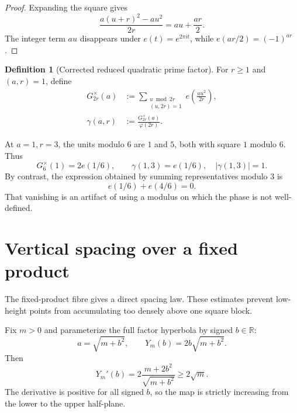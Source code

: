 \documentclass[11pt]{article}
\theoremstyle{definition}
\newtheorem{definition}[theorem]{Definition}
\newcommand{\1}{\mathbf{1}}
\newcommand{\R}{\mathbb{R}}
\begin{document}
\begin{proof}
Expanding the square gives
\[
 \frac{a(u+r)^2-au^2}{2r}=au+\frac{ar}{2}.
\]
The integer term $au$ disappears under $e(t)=e^{2\pi i t}$, while $e(ar/2)=(-1)^{ar}$.
\end{proof}

\begin{definition}[Corrected reduced quadratic prime factor]
\label{def:corrected-quadratic-factor}
For $r\ge1$ and $(a,r)=1$, define
\begin{align}
 G_{2r}^{\times}(a)
 &:={}
 \sum_{\substack{u\bmod 2r\\(u,2r)=1}}
 e\!\left(\frac{au^2}{2r}\right),
 \label{eq:corrected-reduced-Gauss}\\
 \gamma(a,r)
 &:={}
 \frac{G_{2r}^{\times}(a)}{\varphi(2r)}.
 \label{eq:normalized-corrected-factor}
\end{align}
\end{definition}

At $a=1,r=3$, the units modulo $6$ are $1$ and $5$, both with square $1$ modulo $6$.  Thus
\begin{equation}
 G_{6}^{\times}(1)=2e(1/6),
 \qquad
 \boxed{\gamma(1,3)=e(1/6),\quad |\gamma(1,3)|=1.}
 \label{eq:r3-corrected-factor}
\end{equation}
By contrast, the expression obtained by summing representatives modulo $3$ is
\[
 e(1/6)+e(4/6)=0.
\]
That vanishing is an artifact of using a modulus on which the phase is not well-defined.


\section{Vertical spacing over a fixed product}
\label{sec:vertical-spacing}

The fixed-product fibre gives a direct spacing law.  These estimates prevent low-height points from accumulating too densely above one square block.

Fix $m>0$ and parameterize the full factor hyperbola by signed $b\in\R$:
\begin{equation}
 a=\sqrt{m+b^2},
 \qquad
 Y_m(b)=2b\sqrt{m+b^2}.
 \label{eq:Y-b}
\end{equation}
Then
\begin{equation}
 Y_m'(b)
 =2\frac{m+2b^2}{\sqrt{m+b^2}}
 \ge2\sqrt m.
 \label{eq:Y-derivative}
\end{equation}
The derivative is positive for all signed $b$, so the map is strictly increasing from the lower to the upper half-plane.
\end{document}
